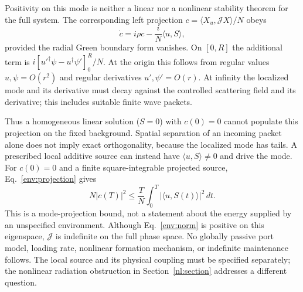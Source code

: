 Positivity on this mode is neither a linear nor a nonlinear stability
theorem for the full system.
The corresponding left projection $c=\langle X_u,\mathcal JX\rangle/N$
obeys
\begin{equation}
 \dot c=i\rho c-\frac{i}{N}\langle u,S\rangle,
 \label{env:projection}
\end{equation}
provided the radial Green boundary form vanishes. On $[0,R]$ the
additional term is $i[u'^\dagger\psi-u^\dagger\psi']_0^R/N$.
At the origin this follows from regular values $u,\psi=O(r^2)$ and
regular derivatives $u',\psi'=O(r)$. At infinity the localized mode and
its derivative must decay against the controlled scattering field and
its derivative; this includes suitable finite wave packets.

Thus a homogeneous linear solution ($S=0$) with $c(0)=0$ cannot populate
this projection on the fixed background. Spatial separation of an
incoming packet alone does not imply exact orthogonality, because the
localized mode has tails. A prescribed local additive source can instead
have $\langle u,S\rangle\ne0$ and drive the mode. For $c(0)=0$ and a
finite square-integrable projected source, Eq.~\eqref{env:projection} gives
\begin{equation}
 N|c(T)|^2\leq\frac{T}{N}\int_0^T|\langle u,S(t)\rangle|^2\,dt.
 \label{env:pulse}
\end{equation}
This is a mode-projection bound, not a statement about the energy supplied
by an unspecified environment. Although Eq.~\eqref{env:norm} is positive
on this eigenspace, $\mathcal J$ is indefinite on the full phase space.
No globally passive port model, loading rate, nonlinear formation
mechanism, or indefinite maintenance follows. The local source and its
physical coupling must be specified separately; the nonlinear radiation
obstruction in Section~\ref{nl:section} addresses a different question.
